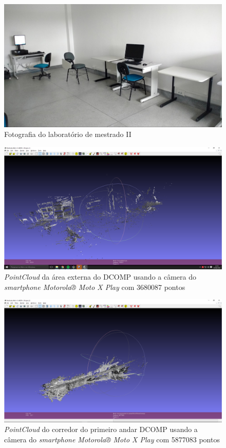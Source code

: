 \begin{figure}[H]
	\centering
		\includegraphics[width= \textwidth]{Imagens/figura4-15.jpg}
	\caption{Fotografia do laboratório de mestrado II}
	\label{fig4:15}
\end{figure}

\begin{figure}[H]
	\centering
		\includegraphics[width= \textwidth]{Imagens/dcompMotox.PNG}
	\caption{\textit{PointCloud} da área externa do DCOMP usando a câmera do \textit{smartphone Motorola® Moto X Play} com 3680087 pontos}
\end{figure}

\begin{figure}[H]
	\centering
		\includegraphics[width= \textwidth]{Imagens/corredorMotox.PNG}
	\caption{\textit{PointCloud} do corredor do primeiro andar DCOMP usando a câmera do \textit{smartphone Motorola® Moto X Play} com 5877083 pontos}
\end{figure}


